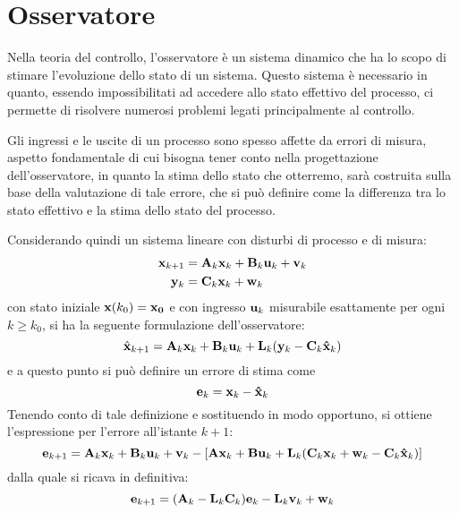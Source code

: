 \section{Osservatore}
Nella teoria del controllo, l'osservatore è un sistema dinamico che ha lo scopo di stimare l'evoluzione dello stato di un sistema. Questo sistema è necessario in quanto, essendo impossibilitati ad accedere allo stato effettivo del processo, ci permette di risolvere numerosi problemi legati principalmente al controllo.

Gli ingressi e le uscite di un processo sono spesso affette da errori di misura, aspetto fondamentale di cui bisogna  tener conto  nella progettazione dell'osservatore, in quanto la stima dello stato che otterremo, sarà costruita sulla base della valutazione di tale errore, che si può definire come la differenza tra lo stato effettivo e la stima dello stato del processo.

\noindent Considerando quindi un sistema lineare con disturbi di processo e di misura:
\begin{align*}
\mathbf{x}_{k+1} &= \mathbf{A}_k\mathbf{x}_k + \mathbf{B}_k\mathbf{u}_k + \mathbf{v}_k \\
\mathbf{y}_k &= \mathbf{C}_k\mathbf{x}_k + \mathbf{w}_k
\end{align*}
con stato iniziale $\mathbf{x}(k_0)=\mathbf{x_0}$ e con ingresso $\mathbf{u}_k$ misurabile  esattamente per ogni $k \geq k_0$, si ha la seguente formulazione dell'osservatore:
\[\hat{\mathbf{x}}_{k+1}=\mathbf{A}_k\mathbf{x}_k+\mathbf{B}_k\mathbf{u}_k+\mathbf{L}_k(\mathbf{y}_k-\mathbf{C}_k\mathbf{\hat{x}}_k)\]
e a questo punto si può definire un errore di stima come  
\[\mathbf{e}_k={\mathbf{x}}_k-{\mathbf{\hat{x}}}_k\]
Tenendo conto di tale definizione e sostituendo in modo opportuno, si ottiene l'espressione per l'errore all'istante $k+1$:
\[\mathbf{e}_{k+1}=\mathbf{A}_k\mathbf{x}_k+\mathbf{B}_k\mathbf{u}_k+\mathbf{v}_k-[\mathbf{A}\mathbf{x}_k+\mathbf{B}\mathbf{u}_k+\mathbf{L}_k(\mathbf{C}_k\mathbf{x}_k+\mathbf{w}_k-\mathbf{C}_k\mathbf{\hat{x}}_k)]\]
dalla quale si ricava in definitiva:
\[\mathbf{e}_{k+1}=(\mathbf{A}_k-\mathbf{L}_k\mathbf{C}_k)\mathbf{e}_k-\mathbf{L}_k\mathbf{v}_k+\mathbf{w}_k\]